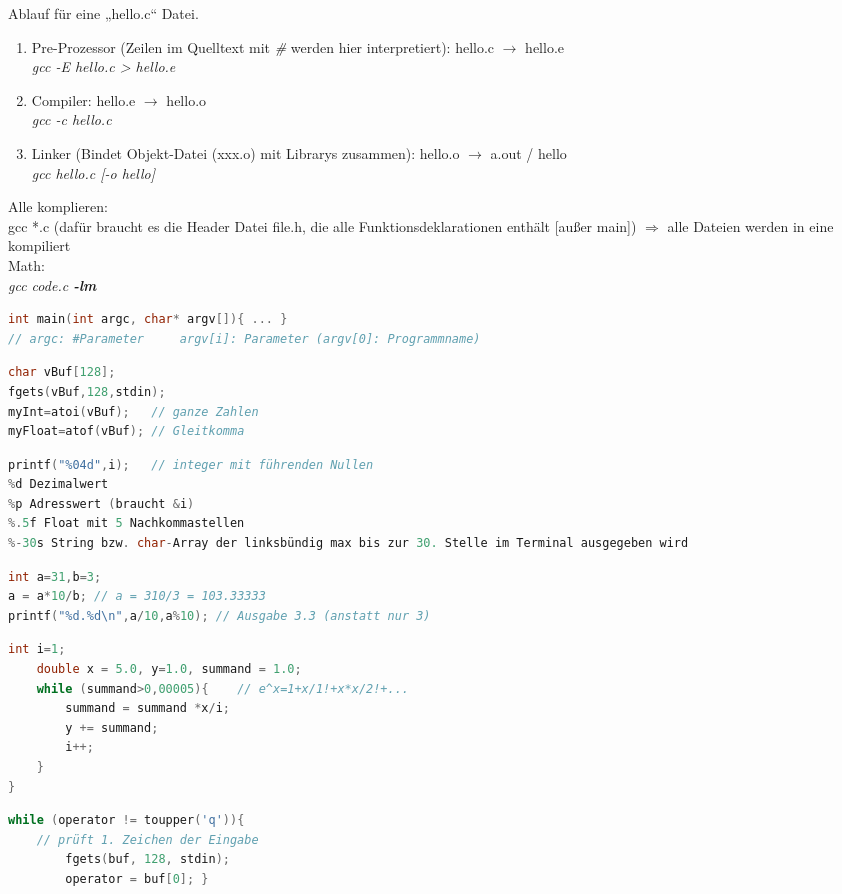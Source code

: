 \begin{multicols*}{3}

Ablauf für eine „hello.c“ Datei.
\begin{enumerate}
\item Pre-Prozessor (Zeilen im Quelltext mit \emph{\#} werden hier interpretiert): hello.c $\rightarrow$ hello.e \\
\emph{gcc -E hello.c > hello.e}
\item Compiler: hello.e $\rightarrow$ hello.o\\
\emph{gcc -c hello.c}
\item Linker (Bindet Objekt-Datei (xxx.o) mit Librarys zusammen): hello.o $\rightarrow$ a.out / hello\\
\emph{gcc hello.c [-o hello]}
\end{enumerate}

Alle komplieren:\\
gcc *.c (dafür braucht es die Header Datei file.h, die alle Funktionsdeklarationen enthält [außer main]) $\Rightarrow$ alle Dateien werden in eine kompiliert \smallskip\\
Math:\\
\emph{gcc code.c \textbf{-lm}}
\HRule[4pt]
\begin{lstlisting}[language=C]
int main(int argc, char* argv[]){ ... } 
// argc: #Parameter		argv[i]: Parameter (argv[0]: Programmname)
\end{lstlisting}
\HDRule[4pt]
\begin{lstlisting}[language=C]
char vBuf[128];
fgets(vBuf,128,stdin); 
myInt=atoi(vBuf);	// ganze Zahlen
myFloat=atof(vBuf); // Gleitkomma
\end{lstlisting}
\HDRule[4pt]
\begin{lstlisting}[language=C]
printf("%04d",i);	// integer mit führenden Nullen
%d Dezimalwert
%p Adresswert (braucht &i)
%.5f Float mit 5 Nachkommastellen
%-30s String bzw. char-Array der linksbündig max bis zur 30. Stelle im Terminal ausgegeben wird
\end{lstlisting}
\HDRule[4pt]
\begin{lstlisting}[language=C]
int a=31,b=3;
a = a*10/b;	// a = 310/3 = 103.33333
printf("%d.%d\n",a/10,a%10); // Ausgabe 3.3 (anstatt nur 3)
\end{lstlisting}
\HDRule[4pt]
\begin{lstlisting}[language=C]
	int i=1;
	double x = 5.0, y=1.0, summand = 1.0;
	while (summand>0,00005){	// e^x=1+x/1!+x*x/2!+...
		summand = summand *x/i;
		y += summand;
		i++;
	}
}
\end{lstlisting}
\HDRule[4pt]
\begin{lstlisting}[language=C]
	while (operator != toupper('q')){	
	// prüft 1. Zeichen der Eingabe
		fgets(buf, 128, stdin);
		operator = buf[0]; }
		

\end{lstlisting}
\end{multicols*}
